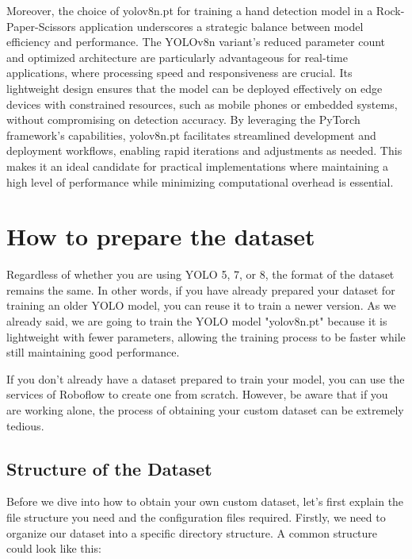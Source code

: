 \documentclass[../main]{subfiles}
\begin{document}
Moreover, the choice of yolov8n.pt for training a hand detection model in a Rock-Paper-Scissors application underscores a strategic balance between model efficiency and performance. The YOLOv8n variant’s reduced parameter count and optimized architecture are particularly advantageous for real-time applications, where processing speed and responsiveness are crucial. Its lightweight design ensures that the model can be deployed effectively on edge devices with constrained resources, such as mobile phones or embedded systems, without compromising on detection accuracy. By leveraging the PyTorch framework’s capabilities, yolov8n.pt facilitates streamlined development and deployment workflows, enabling rapid iterations and adjustments as needed. This makes it an ideal candidate for practical implementations where maintaining a high level of performance while minimizing computational overhead is essential.
\section{How to prepare the dataset}
Regardless of whether you are using YOLO 5, 7, or 8, the format of the dataset remains the same. In other words, if you have already prepared your dataset for training an older YOLO model, you can reuse it to train a newer version. As we already said, we are going to train the YOLO model "yolov8n.pt" because it is lightweight with fewer parameters, allowing the training process to be faster while still maintaining good performance.

If you don't already have a dataset prepared to train your model, you can use the services of Roboflow to create one from scratch. However, be aware that if you are working alone, the process of obtaining your custom dataset can be extremely tedious.

\subsection{Structure of the Dataset}
Before we dive into how to obtain your own custom dataset, let's first explain the file structure you need and the configuration files required. Firstly, we need to organize our dataset into a specific directory structure. A common structure could look like this:
\end{document}
